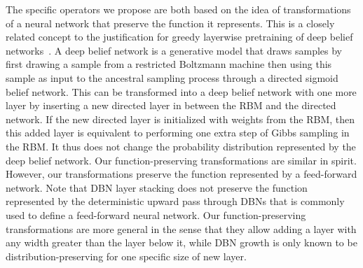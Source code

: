\documentclass{article} %
\begin{document}
The specific operators we propose are both based on the idea of transformations
of a neural network that preserve the function it represents. This is a closely
related concept to the justification for greedy layerwise pretraining of
deep belief networks~\citep{Hinton06}. A deep belief network is a generative
model that draws samples by first drawing a sample from a restricted Boltzmann
machine then using this sample as input to the ancestral sampling process through
a directed sigmoid belief network. This can be transformed into a deep belief
network with one more layer by inserting a new directed layer in between the
RBM and the directed network. If the new directed layer is initialized with
weights from the RBM, then this added layer is equivalent to performing one
extra step of Gibbs sampling in the RBM. It thus does not change the probability
distribution represented by the deep belief network.
Our function-preserving transformations are similar in spirit.
However, our transformations preserve the function represented by a
feed-forward network. Note that DBN layer stacking does not preserve the
function represented by the deterministic upward pass through DBNs that is
commonly used to define a feed-forward neural network.
Our function-preserving transformations are more general in the sense that
they allow adding a layer with any width greater than the layer below it,
while DBN growth is only known to be distribution-preserving for one specific
size of new layer.
\end{document}
